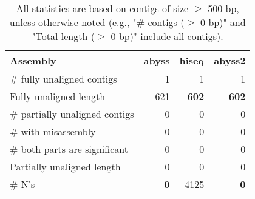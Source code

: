 \documentclass[12pt,a4paper]{article}
\begin{document}
\begin{table}[ht]
\begin{center}
\caption{All statistics are based on contigs of size $\geq$ 500 bp, unless otherwise noted (e.g., "\# contigs ($\geq$ 0 bp)" and "Total length ($\geq$ 0 bp)" include all contigs).}
\begin{tabular}{|l*{3}{|r}|}
\hline
Assembly & abyss & hiseq & abyss2 \\ \hline
\# fully unaligned contigs & 1 & 1 & 1 \\ \hline
Fully unaligned length & 621 & {\bf 602} & {\bf 602} \\ \hline
\# partially unaligned contigs & 0 & 0 & 0 \\ \hline
\hspace{5mm}\# with misassembly & 0 & 0 & 0 \\ \hline
\hspace{5mm}\# both parts are significant & 0 & 0 & 0 \\ \hline
Partially unaligned length & 0 & 0 & 0 \\ \hline
\# N's & {\bf 0} & 4125 & {\bf 0} \\ \hline
\end{tabular}
\end{center}
\end{table}
\end{document}
